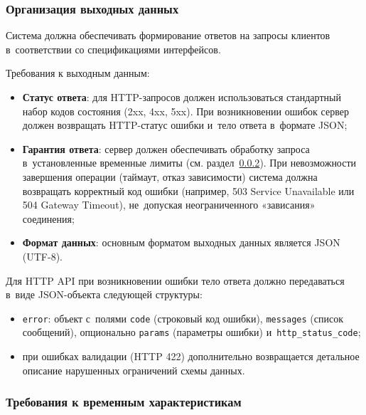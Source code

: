 \documentclass[12pt,a4paper]{extarticle}
\begin{document}
\subsubsection{Организация выходных данных}
\label{sec:output_data}

\begin{hseExample}
Система должна обеспечивать формирование ответов на запросы клиентов в~соответствии со спецификациями интерфейсов.

Требования к выходным данным:
\begin{itemize}[nosep, leftmargin=1.25cm]
    \item \textbf{Статус ответа}: для HTTP-запросов должен использоваться стандартный набор кодов состояния (2xx, 4xx, 5xx). При возникновении ошибок сервер должен возвращать HTTP-статус ошибки и~тело ответа в~формате JSON;
    \item \textbf{Гарантия ответа}: сервер должен обеспечивать обработку запроса в~установленные временные лимиты (см. раздел~\ref{sec:temporal_reqs}). При невозможности завершения операции (таймаут, отказ зависимости) система должна возвращать корректный код ошибки (например, 503 Service Unavailable или 504 Gateway Timeout), не~допуская неограниченного «зависания» соединения;
    \item \textbf{Формат данных}: основным форматом выходных данных является JSON (UTF-8).
\end{itemize}

Для HTTP API при возникновении ошибки тело ответа должно передаваться в~виде JSON-объекта следующей структуры:
\begin{itemize}[nosep, leftmargin=1.25cm]
    \item \texttt{error}: объект с~полями \texttt{code} (строковый код ошибки), \texttt{messages} (список сообщений), опционально \texttt{params} (параметры ошибки) и~\texttt{http\_status\_code};
    \item при ошибках валидации (HTTP 422) дополнительно возвращается детальное описание нарушенных ограничений схемы данных.
\end{itemize}
\end{hseExample}

\subsubsection{Требования к временным характеристикам}
\label{sec:temporal_reqs}
\end{document}
